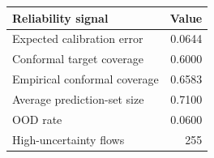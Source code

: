 \begin{tabular}{lr}
\hline
Reliability signal & Value \\
\hline
Expected calibration error & 0.0644 \\
Conformal target coverage & 0.6000 \\
Empirical conformal coverage & 0.6583 \\
Average prediction-set size & 0.7100 \\
OOD rate & 0.0600 \\
High-uncertainty flows & 255 \\
\hline
\end{tabular}
